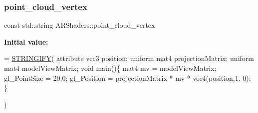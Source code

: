 \subsubsection{\texorpdfstring{point\+\_\+cloud\+\_\+vertex}{point\_cloud\_vertex}}
{\footnotesize\ttfamily const std\+::string A\+R\+Shaders\+::point\+\_\+cloud\+\_\+vertex}

{\bfseries Initial value\+:}
\begin{DoxyCode}
= \hyperlink{_a_r_shaders_8h_ab06e1eb2e9bf38e0d452b1f796aed208}{STRINGIFY}(
                                                 attribute vec3 position;
                                                 uniform mat4 projectionMatrix;
                                                 uniform mat4 modelViewMatrix;
                                                 \textcolor{keywordtype}{void} main()\{
                                                     mat4 mv = modelViewMatrix;
                                                     gl\_PointSize = 20.0;
                                                     gl\_Position = projectionMatrix * mv * vec4(position,1.
      0);
                                                 \}
                                                 
                                                 )
\end{DoxyCode}

